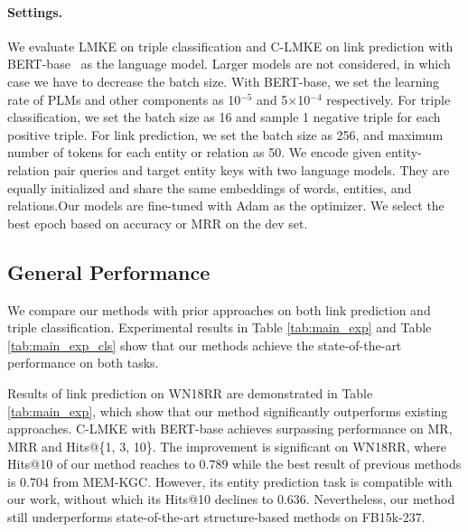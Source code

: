 \documentclass{article}
\begin{document}
\paragraph{\textbf{Settings.}}
We evaluate LMKE on triple classification and C-LMKE on link prediction
with BERT-base~\cite{devlin2018bert} as the language model. 
Larger models are not considered, in which case we have to decrease the batch size.
With BERT-base, we set the learning rate of PLMs and  other components as 10$^{-5}$  and 5$\times$10$^{-4}$ respectively. 
For triple classification, we set the batch size as 16 and sample 1 negative triple for each positive triple. 
For link prediction, we set the batch size as 256, and maximum number of tokens for each entity or relation as 50. We encode given entity-relation pair queries and target entity keys with two language models. They are equally initialized and share the same embeddings of words, entities, and relations.Our models are fine-tuned with Adam as the optimizer. 
We select the best epoch based on accuracy or MRR on the dev set.  


\subsection{General Performance}


We compare our methods with prior approaches on both link prediction and triple classification.
Experimental results in Table \ref{tab:main_exp} and Table \ref{tab:main_exp_cls}  show that our methods achieve the state-of-the-art performance on both tasks.

Results of link prediction on WN18RR are demonstrated in Table \ref{tab:main_exp}, which show that 
our method significantly outperforms existing approaches.
C-LMKE with BERT-base achieves surpassing performance on MR, MRR and Hits@\{1, 3, 10\}.
The improvement is significant on WN18RR, where Hits@10 of our method reaches to 0.789 while the best result of previous methods is 0.704 from MEM-KGC. 
However, its entity prediction task is compatible with our work, without which its Hits@10 declines to 0.636. 
Nevertheless, our method still underperforms state-of-the-art structure-based methods on FB15k-237.
\end{document}
